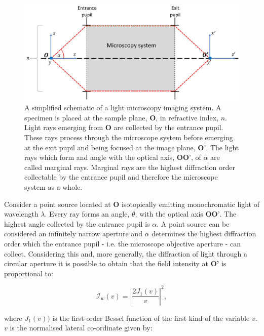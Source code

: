 \begin{figure}[h]
	\centering
	\includegraphics[width=\textwidth]{images/simplified_microscope_layout.jpg}
	\caption[A simplified schematic of a light microscopy imaging system.]{A simplified 
		schematic of a light microscopy imaging system. A specimen 
		is placed at the sample plane, $\textbf{O}$, in refractive index, $n$. Light 
		rays emerging from $\textbf{O}$ are collected by the entrance pupil. These 
		rays process through the microscope system before emerging at the exit pupil 
		and being focused at the image plane, $\textbf{O'}$. The light rays which 
		form and angle with the optical axis, $\textbf{OO'}$, of $\alpha$ are called
		marginal rays. Marginal rays are the highest diffraction order collectable by
		the entrance pupil and therefore the microscope system as a whole.}
	\label{fig:simplified_microscope_layout}
\end{figure}

Consider a point source located at $\textbf{O}$ isotopically emitting 
monochromatic light of wavelength $\lambda$. Every ray forms an angle, 
$\theta$, with the optical axis $\textbf{OO'}$. The highest angle collected
by the entrance pupil is $\alpha$. A point source can be considered an 
infinitely narrow aperture and $\alpha$ determines the highest 
diffraction order which the entrance pupil - i.e. the microscope
objective aperture - can collect\cite{davidson2002optical}. Considering this 
and, more generally, the diffraction of light through a circular aperture 
it is possible to obtain that the field intensity at \textbf{O'} is 
proportional to\cite{goodman2005introduction,born2013principles}:

\begin{equation}\label{eq:image_field_insentity}
\mathcal{I}_{w}(v) = \left|\frac{2J_{1}(v)}{v}\right|^2,
\end{equation}

where $J_{1}(v))$ is the first-order Bessel function of the first kind of
the variable $v$\cite{watson1995treatise}. $v$ is the normalised lateral 
co-ordinate given by\cite{wilson1984theory}:

